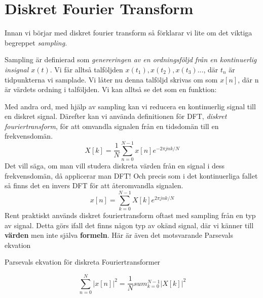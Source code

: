 \documentclass{article}
\begin{document}
\section{Diskret Fourier Transform}

Innan vi börjar med diskret fourier transform så förklarar vi lite om det viktiga begreppet \emph{sampling.}

Sampling är definierad som \emph{genereringen av en ordningsföljd från en kontinuerlig insignal $x(t)$}. Vi får alltså talföljden $x(t_1), x(t_2), x(t_3)... $, där $t_n$ är tidpunkterna vi samplade. Vi låter nu denna talföljd skrivas om som $x[n]$, där n är värdets ordning i talföljden. Vi kan alltså se det som en funktion:



Med andra ord, med hjälp av sampling kan vi reducera en kontinuerlig signal till en diskret signal. Därefter kan vi använda definitionen för DFT, \emph{diskret fouriertransform}, för att omvandla signalen från en tidsdomän till en frekvensdomän.
\[X[k] = \frac{1}{N} \sum_{n=0}^{N-1} x[n] e^{-2 \pi j n k/N}\]
Det vill säga, om man vill studera diskreta värden från en signal i dess frekvensdomän, då applicerar man DFT! Och precis som i det kontinuerliga fallet så finns det en invers DFT för att återomvandla signalen.
\[x[n] = \sum_{k=0}^{N-1} X[k] e^{2 \pi j n k/N} \] %
Rent praktiskt används diskret fouriertransform oftast med sampling från en typ av signal. Detta görs ifall det finns någon typ av okänd signal, där vi känner till \textbf{värden} men inte själva \textbf{formeln}. %
Här är även det motsvarande Parsevals ekvation

Parsevals ekvation för diskreta Fouriertransformer

\[\sum_{n=0}^{N} |x[n]|^2 = \frac{1}{N} sum_{k=0}^{N-1} |X[k]|^2 \]

\end{document}
